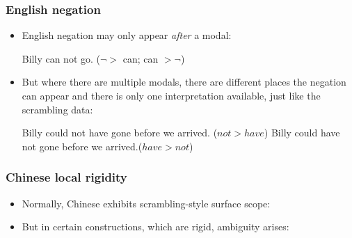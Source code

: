 \documentclass[aspectratio=169]{beamer}
\begin{document}
\begin{frame}
	\frametitle{English negation}\pause
	
\begin{itemize}
	\item English negation may only appear \emph{after} a modal:\pause
\begin{exe}
\ex Billy can not go. \label{cannot}\hfill ($\neg >$ can; can $> \neg$) \pause
{}\pause
\end{exe}

\item But where there are multiple modals, there are different places the negation can appear and there is only one interpretation available, just like the scrambling data:\pause

\begin{exe}
	\ex Billy could not have gone before we arrived. \hfill ($not>have$)\pause
	\ex Billy could have not gone before we arrived.\hfill ($have>not$)
\end{exe}
\end{itemize}

\end{frame}

\begin{frame}
	\frametitle{Chinese local rigidity}\pause

	\begin{itemize}
		\item Normally, Chinese exhibits scrambling-style surface scope:\pause
\begin{exe}
\ex \begin{xlist}\label{chin}
\pause
{}\end{xlist}
\end{exe}\pause

\item But in certain constructions, which are rigid, ambiguity arises:\pause

\begin{exe}
\end{exe}
	\end{itemize}
\end{frame}
\end{document}
